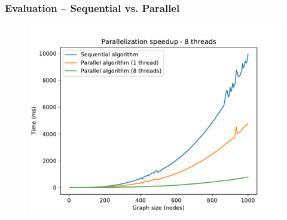 \documentclass[11pt,xcolor=pdflatex]{beamer}
\begin{document}

\begin{frame}\frametitle{Evaluation -- Sequential vs. Parallel}

\begin{figure}
   \includegraphics[width=\linewidth]{comp_8thread.pdf}
\end{figure}

\end{frame}



\end{document}
